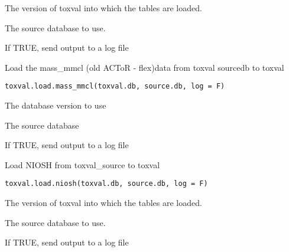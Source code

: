 \documentclass[letterpaper]{book}
\begin{document}
%
\begin{Arguments}
\begin{ldescription}
\item[\code{toxval.db}] The version of toxval into which the tables are loaded.

\item[\code{source.db}] The source database to use.

\item[\code{log}] If TRUE, send output to a log file
\end{ldescription}
\end{Arguments}
%
\begin{Description}\relax
Load the mass\_mmcl (old ACToR - flex)data  from toxval sourcedb to toxval
\end{Description}
%
\begin{Usage}
\begin{verbatim}
toxval.load.mass_mmcl(toxval.db, source.db, log = F)
\end{verbatim}
\end{Usage}
%
\begin{Arguments}
\begin{ldescription}
\item[\code{toxval.db}] The database version to use

\item[\code{source.db}] The source database

\item[\code{log}] If TRUE, send output to a log file
\end{ldescription}
\end{Arguments}
%
\begin{Description}\relax
Load NIOSH from toxval\_source to toxval
\end{Description}
%
\begin{Usage}
\begin{verbatim}
toxval.load.niosh(toxval.db, source.db, log = F)
\end{verbatim}
\end{Usage}
%
\begin{Arguments}
\begin{ldescription}
\item[\code{toxval.db}] The version of toxval into which the tables are loaded.

\item[\code{source.db}] The source database to use.

\item[\code{log}] If TRUE, send output to a log file
\end{ldescription}
\end{Arguments}
\end{document}
